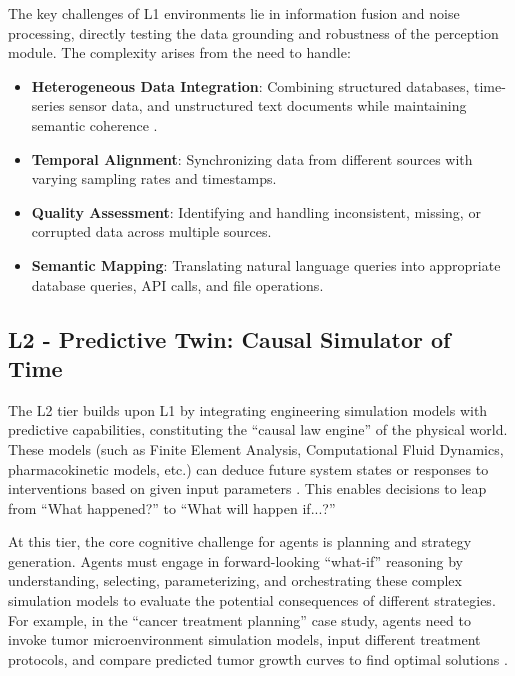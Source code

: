 The key challenges of L1 environments lie in information fusion and noise processing, directly testing the data grounding and robustness of the perception module. The complexity arises from the need to handle:
\begin{itemize}
\item \textbf{Heterogeneous Data Integration}: Combining structured databases, time-series sensor data, and unstructured text documents while maintaining semantic coherence \cite{lu2020digital}.
\item \textbf{Temporal Alignment}: Synchronizing data from different sources with varying sampling rates and timestamps.
\item \textbf{Quality Assessment}: Identifying and handling inconsistent, missing, or corrupted data across multiple sources.
\item \textbf{Semantic Mapping}: Translating natural language queries into appropriate database queries, API calls, and file operations.
\end{itemize}

\subsection{L2 - Predictive Twin: Causal Simulator of Time}

The L2 tier builds upon L1 by integrating engineering simulation models with predictive capabilities, constituting the ``causal law engine'' of the physical world. These models (such as Finite Element Analysis, Computational Fluid Dynamics, pharmacokinetic models, etc.) can deduce future system states or responses to interventions based on given input parameters \cite{rasheed2020digital, fuller2020digital}. This enables decisions to leap from ``What happened?'' to ``What will happen if...?''

At this tier, the core cognitive challenge for agents is planning and strategy generation. Agents must engage in forward-looking ``what-if'' reasoning by understanding, selecting, parameterizing, and orchestrating these complex simulation models to evaluate the potential consequences of different strategies. For example, in the ``cancer treatment planning'' case study, agents need to invoke tumor microenvironment simulation models, input different treatment protocols, and compare predicted tumor growth curves to find optimal solutions \cite{rasheed2020digital}.

